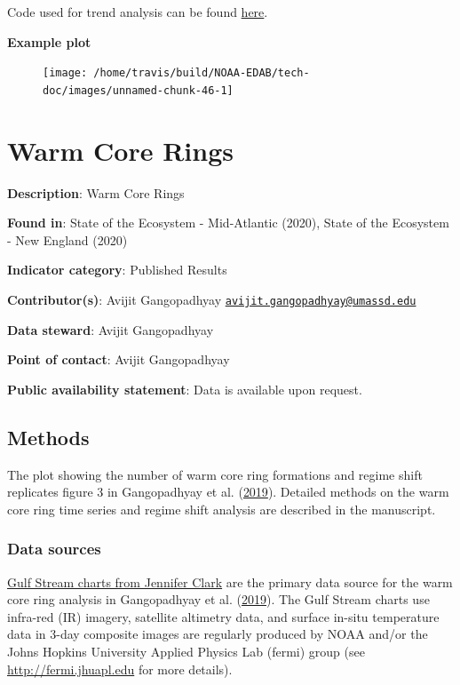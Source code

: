 \documentclass[
]{book}
\begin{document}
Code used for trend analysis can be found \href{https://github.com/NOAA-EDAB/tech-doc/blob/master/R/stored_scripts/trend_analysis.R}{here}.

\textbf{Example plot}

\begin{figure}

{\centering \texttt{[image: /home/travis/build/NOAA-EDAB/tech-doc/images/unnamed-chunk-46-1]} 

}

\end{figure}

\hypertarget{warm-core-rings}{%
\chapter{Warm Core Rings}\label{warm-core-rings}}

\textbf{Description}: Warm Core Rings

\textbf{Found in}: State of the Ecosystem - Mid-Atlantic (2020), State of the Ecosystem - New England (2020)

\textbf{Indicator category}: Published Results

\textbf{Contributor(s)}: Avijit Gangopadhyay \href{mailto:avijit.gangopadhyay@umassd.edu}{\nolinkurl{avijit.gangopadhyay@umassd.edu}}

\textbf{Data steward}: Avijit Gangopadhyay

\textbf{Point of contact}: Avijit Gangopadhyay

\textbf{Public availability statement}: Data is available upon request.

\hypertarget{methods-44}{%
\section{Methods}\label{methods-44}}

The plot showing the number of warm core ring formations and regime shift replicates figure 3 in Gangopadhyay et al. (\protect\hyperlink{ref-gangopadhyay2019}{2019}). Detailed methods on the warm core ring time series and regime shift analysis are described in the manuscript.

\hypertarget{data-sources-44}{%
\subsection{Data sources}\label{data-sources-44}}

\href{https://jcgulfstream.com/charts/}{Gulf Stream charts from Jennifer Clark} are the primary data source for the warm core ring analysis in Gangopadhyay et al. (\protect\hyperlink{ref-gangopadhyay2019}{2019}). The Gulf Stream charts use infra-red (IR) imagery, satellite altimetry data, and surface in-situ temperature data in 3-day composite images are regularly produced by NOAA and/or the Johns Hopkins University Applied Physics Lab (fermi) group (see \url{http://fermi.jhuapl.edu} for more details).
\end{document}

